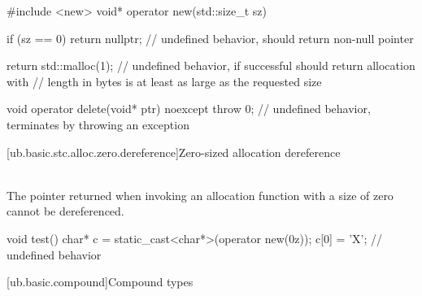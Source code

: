 \pnum
\begin{example}
\begin{codeblock}
#include <new>
void* operator new(std::size_t sz) {
  if (sz == 0)
    return nullptr;             // undefined behavior,  should return non-null pointer

  return std::malloc(1);        // undefined behavior, if successful should return allocation with
                                // length in bytes is at least as large as the requested size
}
void operator delete(void* ptr) noexcept {
  throw 0;                      // undefined behavior, terminates by throwing an exception
}
\end{codeblock}
\end{example}

[ub.basic.stc.alloc.zero.dereference]{Zero-sized allocation dereference}

\pnum
{} \\
The pointer returned when invoking an allocation function with a size of zero
cannot be dereferenced.

\pnum
\begin{example}
\begin{codeblock}
void test()
{
    char* c = static_cast<char*>(operator new(0z));
    c[0] = 'X';     // undefined behavior
}
\end{codeblock}
\end{example}

[ub.basic.compound]{Compound types}

